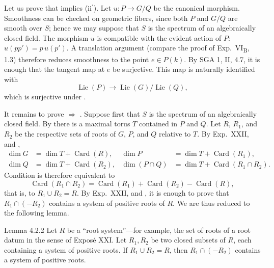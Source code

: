 Let us prove that \textup{} implies
\textup{(ii\(^{\prime}\))}.  Let \(u:P\to G/Q\) be the canonical
morphism.  Smoothness can be checked on geometric fibers, since both
\(P\) and \(G/Q\) are smooth over \(S\); hence we may suppose that
\(S\) is the spectrum of an algebraically closed field.  The morphism
\(u\) is compatible with the evident action of \(P\):
\(u(pp')=p\,u(p')\).  A translation argument (compare the proof of
Exp.\ VI\textsubscript{B}, 1.3) therefore reduces smoothness to the
point \(e\in P(k)\).  By SGA 1, II, 4.7, it is enough that the tangent
map at \(e\) be surjective.  This map is naturally identified with
\[
 \operatorname{Lie}(P)\longrightarrow
 \operatorname{Lie}(G)/\operatorname{Lie}(Q),
\]
which is surjective under \textup{}.

It remains to prove \textup{} \(\Rightarrow\) \textup{}.
Suppose first that \(S\) is the spectrum of an algebraically closed
field.  By  there is a maximal torus \(T\) contained in \(P\) and
\(Q\).  Let \(R\), \(R_1\), and \(R_2\) be the respective sets of roots
of \(G\), \(P\), and \(Q\) relative to \(T\).  By Exp.\ XXII,  and
,
\[
\begin{aligned}
 \dim G&=\dim T+\operatorname{Card}(R),&
 \dim P&=\dim T+\operatorname{Card}(R_1),\\
 \dim Q&=\dim T+\operatorname{Card}(R_2),&
 \dim(P\cap Q)&=\dim T+\operatorname{Card}(R_1\cap R_2).
\end{aligned}
\]
Condition \textup{} is therefore equivalent to
\[
 \operatorname{Card}(R_1\cap R_2)
 =\operatorname{Card}(R_1)+\operatorname{Card}(R_2)
  -\operatorname{Card}(R),
\]
that is, to \(R_1\cup R_2=R\).  By Exp.\ XXII,  and , it is
enough to prove that \(R_1\cap(-R_2)\) contains a system of positive
roots of \(R\).  We are thus reduced to the following lemma.

\begin{sgastatement}{Lemma 4.2.2}
Let \(R\) be a ``root system''---for example, the set of roots of a root
datum in the sense of Exposé XXI.  Let \(R_1,R_2\) be two closed subsets
of \(R\), each containing a system of positive roots.  If
\(R_1\cup R_2=R\), then \(R_1\cap(-R_2)\) contains a system of positive
roots.
\end{sgastatement}

